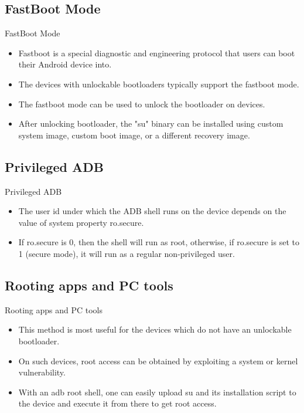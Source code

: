 \documentclass{beamer}
\begin{document}
\subsection{FastBoot Mode}
\begin{frame}{FastBoot Mode}
    \begin{itemize}
        \item Fastboot is a special diagnostic and engineering protocol that users can boot their Android device into.
        \item The devices with unlockable bootloaders typically support the fastboot mode.
        \item The fastboot mode can be used to unlock the bootloader on devices.
        \item After unlocking bootloader, the "su" binary can be installed using custom system image, custom boot image, or a different recovery image.
    \end{itemize}
\end{frame}

\subsection{Privileged ADB}
\begin{frame}{Privileged ADB}
    \begin{itemize}
        \item The user id under which the ADB shell runs on the device depends on the value of system property ro.secure.
        \item If ro.secure is 0, then the shell will run as root, otherwise, if ro.secure is set to 1 (secure mode), it will run as a regular non-privileged user.
    \end{itemize}
\end{frame}

\subsection{Rooting apps and PC tools}
\begin{frame}{Rooting apps and PC tools}
    \begin{itemize}
        \item This method is most useful for the devices which do not have an unlockable bootloader.
        \item On such devices, root access can be obtained by exploiting a system or kernel vulnerability.
        \item With an adb root shell, one can easily upload su and its installation script to the device and execute it from there to get root access.
    \end{itemize}
\end{frame}
\end{document}
